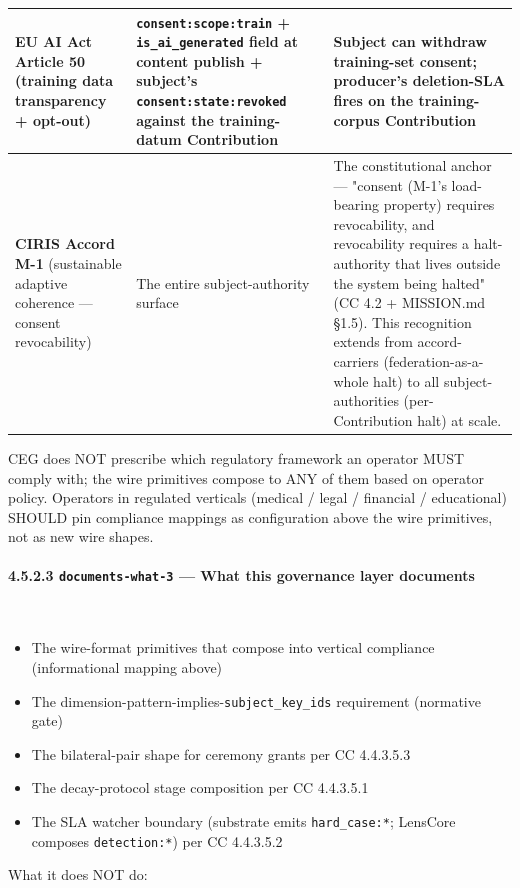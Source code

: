 \documentclass[11pt]{article}
\begin{document}
{\begin{longtable}{|p{5.33cm}|p{5.33cm}|p{5.33cm}|}
\textbf{EU AI Act Article 50} (training data transparency + opt-out) & \texttt{consent:scope:train} + \texttt{is\_ai\_generated} field at content publish + subject's \texttt{consent:state:revoked} against the training-datum Contribution & Subject can withdraw training-set consent; producer's deletion-SLA fires on the training-corpus Contribution \\ \hline
\textbf{CIRIS Accord M-1} (sustainable adaptive coherence — consent revocability) & The entire subject-authority surface & The constitutional anchor — "consent (M-1's load-bearing property) requires revocability, and revocability requires a halt-authority that lives outside the system being halted" (CC 4.2 + MISSION.md §1.5). This recognition extends from accord-carriers (federation-as-a-whole halt) to all subject-authorities (per-Contribution halt) at scale. \\ \hline
\end{longtable}}


CEG does NOT prescribe which regulatory framework an operator MUST comply with; the wire primitives compose to ANY of them based on operator policy. Operators in regulated verticals (medical / legal / financial / educational) SHOULD pin compliance mappings as configuration above the wire primitives, not as new wire shapes.


\paragraph{4.5.2.3 \texttt{documents-what-3} — What this governance layer documents}\mbox{}\\


\begin{itemize}\setlength\itemsep{0pt}
\item The wire-format primitives that compose into vertical compliance (informational mapping above)
\item The dimension-pattern-implies-\texttt{subject\_key\_ids} requirement (normative gate)
\item The bilateral-pair shape for ceremony grants per CC 4.4.3.5.3
\item The decay-protocol stage composition per CC 4.4.3.5.1
\item The SLA watcher boundary (substrate emits \texttt{hard\_case:*}; LensCore composes \texttt{detection:*}) per CC 4.4.3.5.2
\end{itemize}


What it does NOT do:
\end{document}

